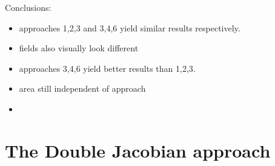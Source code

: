 Conclusions:
\begin{itemize}
\item approaches 1,2,3 and 3,4,6 yield similar results respectively. 
\item fields also visually look different
\item approaches 3,4,6 yield better results than 1,2,3.
\item area still independent of approach
\end{itemize}























\newpage
\vspace{1cm}

\Literature 
\begin{itemize}
\item {}
\end{itemize}

\newpage
\section{The Double Jacobian approach \label{ss:doublejac}}

